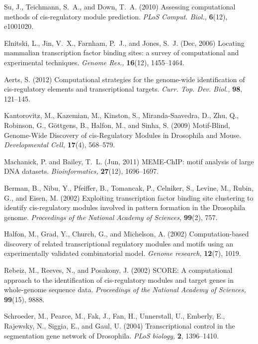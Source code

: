 \documentclass[a4,center,fleqn]{NAR}
\begin{document}
\begin{thebibliography}{10}
Su, J., Teichmann, S.~A., and Down, T.~A. (2010)
{{A}ssessing computational methods of cis-regulatory module prediction}.
{\em PLoS Comput. Biol.,} {\bf 6}(12), e1001020.

Elnitski, L., Jin, V.~X., Farnham, P.~J., and Jones, S.~J. (Dec, 2006)
{{L}ocating mammalian transcription factor binding sites: a survey of
  computational and experimental techniques}.
{\em Genome Res.,} {\bf 16}(12), 1455--1464.

Aerts, S. (2012)
{{C}omputational strategies for the genome-wide identification of
  cis-regulatory elements and transcriptional targets}.
{\em Curr. Top. Dev. Biol.,} {\bf 98}, 121--145.

Kantorovitz, M., Kazemian, M., Kinston, S., Miranda-Saavedra, D., Zhu, Q.,
  Robinson, G., G{\"o}ttgens, B., Halfon, M., and Sinha, S. (2009)
{Motif-Blind, Genome-Wide Discovery of cis-Regulatory Modules in Drosophila and
  Mouse}.
{\em Developmental Cell,} {\bf 17}(4), 568--579.

Machanick, P. and Bailey, T.~L. (Jun, 2011)
{{M}{E}{M}{E}-{C}h{I}{P}: motif analysis of large {D}{N}{A} datasets}.
{\em Bioinformatics,} {\bf 27}(12), 1696--1697.

Berman, B., Nibu, Y., Pfeiffer, B., Tomancak, P., Celniker, S., Levine, M.,
  Rubin, G., and Eisen, M. (2002)
{Exploiting transcription factor binding site clustering to identify
  cis-regulatory modules involved in pattern formation in the Drosophila
  genome}.
{\em Proceedings of the National Academy of Sciences,} {\bf 99}(2), 757.

Halfon, M., Grad, Y., Church, G., and Michelson, A. (2002)
{Computation-based discovery of related transcriptional regulatory modules and
  motifs using an experimentally validated combinatorial model}.
{\em Genome research,} {\bf 12}(7), 1019.

Rebeiz, M., Reeves, N., and Posakony, J. (2002)
{SCORE: A computational approach to the identification of cis-regulatory
  modules and target genes in whole-genome sequence data}.
{\em Proceedings of the National Academy of Sciences,} {\bf 99}(15), 9888.

Schroeder, M., Pearce, M., Fak, J., Fan, H., Unnerstall, U., Emberly, E.,
  Rajewsky, N., Siggia, E., and Gaul, U. (2004)
{Transcriptional control in the segmentation gene network of Drosophila}.
{\em PLoS biology,} {\bf 2}, 1396--1410.


\end{thebibliography}
\end{document}
